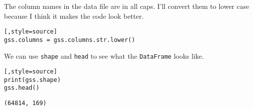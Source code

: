 The column names in the data file are in all caps. I'll convert them to
lower case because I think it makes the code look better.

\begin{lstlisting}[,style=source]
gss.columns = gss.columns.str.lower()
\end{lstlisting}

We can use \passthrough{\lstinline!shape!} and
\passthrough{\lstinline!head!} to see what the
\passthrough{\lstinline!DataFrame!} looks like.

\begin{lstlisting}[,style=source]
print(gss.shape)
gss.head()
\end{lstlisting}

\begin{lstlisting}[style=output]
(64814, 169)
\end{lstlisting}

